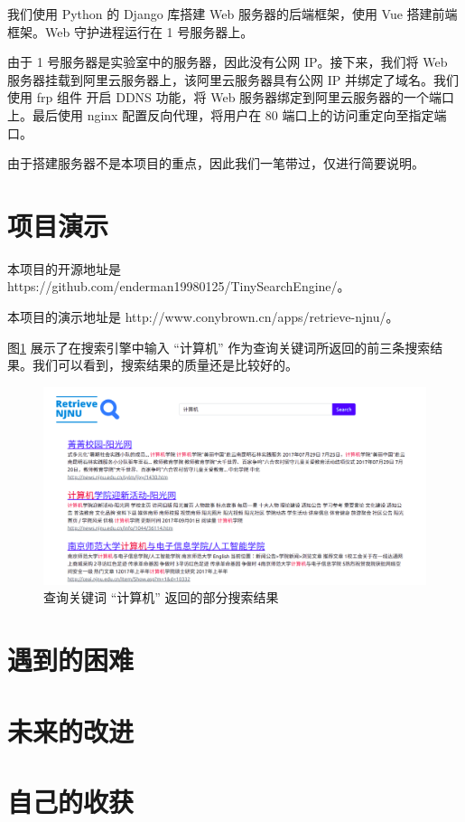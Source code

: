 \documentclass{ctexart}
\begin{document}
    我们使用 Python 的 Django 库搭建 Web 服务器的后端框架，使用 Vue 搭建前端框架。Web 守护进程运行在 1 号服务器上。

    由于 1 号服务器是实验室中的服务器，因此没有公网 IP。接下来，我们将 Web 服务器挂载到阿里云服务器上，该阿里云服务器具有公网 IP 并绑定了域名。我们使用 frp 组件\cite{github-frp} 开启 DDNS 功能，将 Web 服务器绑定到阿里云服务器的一个端口上。最后使用 nginx 配置反向代理，将用户在 80 端口上的访问重定向至指定端口。

    由于搭建服务器不是本项目的重点，因此我们一笔带过，仅进行简要说明。


    \section{项目演示}\label{sec:demo}

    本项目的开源地址是 https://github.com/enderman19980125/TinySearchEngine/。

    本项目的演示地址是 http://www.conybrown.cn/apps/retrieve-njnu/。

    图\ref{fig:demo} 展示了在搜索引擎中输入 “计算机” 作为查询关键词所返回的前三条搜索结果。我们可以看到，搜索结果的质量还是比较好的。

    \begin{figure}[t]
        \centering
        \includegraphics[width=\textwidth]{src/demo}
        \caption{查询关键词 “计算机” 返回的部分搜索结果}
        \label{fig:demo}
    \end{figure}


    \section{遇到的困难}\label{sec:difficulty}


    \section{未来的改进}\label{sec:improvement}


    \section{自己的收获}\label{sec:achievement}

    
    
\end{document}
